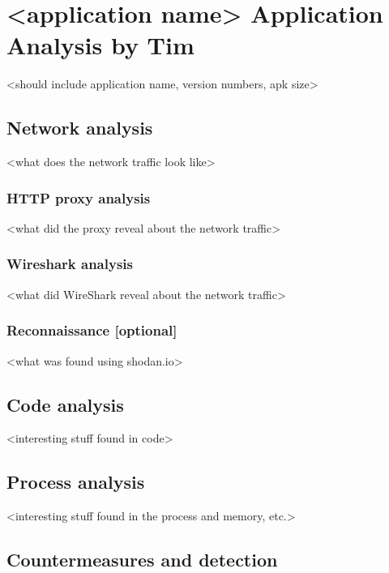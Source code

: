 \section{<application name> Application Analysis by Tim}

<should include application name, version numbers, apk size>







\newpage
\subsection{Network analysis}

<what does the network traffic look like>

\subsubsection{HTTP proxy analysis}

<what did the proxy reveal about the network traffic>

\subsubsection{Wireshark analysis}

<what did WireShark reveal about the network traffic>

\subsubsection{Reconnaissance [optional]}

<what was found using shodan.io>

\newpage
\subsection{Code analysis}

<interesting stuff found in code>

\newpage
\subsection{Process analysis}

<interesting stuff found in the process and memory, etc.>

\newpage
\subsection{Countermeasures and detection}

